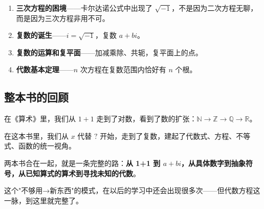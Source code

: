 \begin{enumerate}
  \item \textbf{三次方程的困境}——卡尔达诺公式中出现了 $\sqrt{-1}$，不是因为二次方程无聊，而是因为三次方程非用不可。
  \item \textbf{复数的诞生}——$i = \sqrt{-1}$，复数 $a+bi$。
  \item \textbf{复数的运算和复平面}——加减乘除、共轭，复平面上的点。
  \item \textbf{代数基本定理}——$n$ 次方程在复数范围内恰好有 $n$ 个根。
\end{enumerate}

\subsection*{整本书的回顾}

在《算术》里，我们从 $1+1$ 走到了对数，看到了数的扩张：$\mathbb{N}\to\mathbb{Z}\to\mathbb{Q}\to\mathbb{R}$。

在这本书里，我们从 $x$ 代替 $?$ 开始，走到了复数，建起了代数式、方程、不等式、函数的统一视角。

两本书合在一起，就是一条完整的路：\textbf{从 1+1 到 $a+bi$，从具体数字到抽象符号，从已知算式的算术到寻找未知的代数}。

这个"不够用→新东西"的模式，在以后的学习中还会出现很多次——但代数方程这一脉，到这里就完整了。
